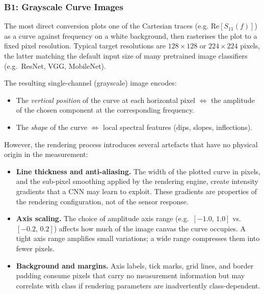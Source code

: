 \subsubsection{B1: Grayscale Curve Images}
\label{sec:repr:routeB:grayscale}

The most direct conversion plots one of the Cartesian traces (e.g. $\text{Re}[S_{11}(f)]$)
as a curve against frequency on a white background, then rasterises the
plot to a fixed pixel resolution.  Typical target resolutions
are $128\times128$ or $224\times224$ pixels, the latter matching the
default input size of many pretrained image classifiers (e.g.\ ResNet,
VGG, MobileNet).

The resulting single-channel (grayscale) image encodes:
\begin{itemize}
    \item The \emph{vertical position} of the curve at each horizontal
        pixel $\Leftrightarrow$ the amplitude of the chosen component at the corresponding
        frequency.
    \item The \emph{shape} of the curve $\Leftrightarrow$ local spectral
        features (dips, slopes, inflections).
\end{itemize}

\noindent
However, the rendering process introduces several artefacts that have no
physical origin in the measurement:

\begin{itemize}
    \item \textbf{Line thickness and anti-aliasing.}  The width of the
        plotted curve in pixels, and the sub-pixel smoothing applied by
        the rendering engine, create intensity gradients that a CNN may
        learn to exploit.  These gradients are properties of the
        rendering configuration, not of the sensor response.
    \item \textbf{Axis scaling.}  The choice of amplitude axis range
        (e.g.\ $[-1.0,\,1.0]$ vs.\
        $[-0.2,\,0.2]$) affects how much
        of the image canvas the curve occupies.  A tight axis range
        amplifies small variations; a wide range compresses them into
        fewer pixels.
    \item \textbf{Background and margins.}  Axis labels, tick marks,
        grid lines, and border padding consume pixels that carry no
        measurement information but may correlate with class if rendering
        parameters are inadvertently class-dependent.
\end{itemize}


